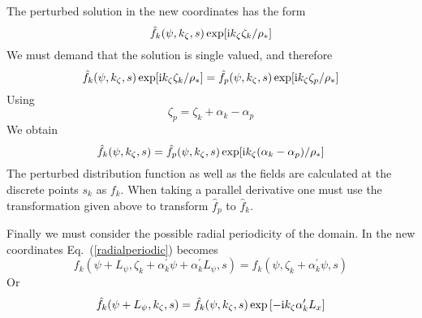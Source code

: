 The perturbed solution in the new coordinates has the form 
\begin{equation} 
\hat f_k (\psi, k_\zeta, s) \exp [ {\rm i} k_\zeta \zeta_k / \rho_* ] 
\end{equation}
We must demand that the solution is single valued, and therefore 
\begin{equation} 
\hat f_k (\psi, k_\zeta, s) \exp [ {\rm i} k_\zeta \zeta_k / \rho_* ] =
\hat f_{p} (\psi, k_\zeta, s) \exp [ {\rm i} k_\zeta \zeta_{p} / \rho_* ]
\end{equation}
Using 
\begin{equation} 
\zeta_{p} = \zeta_k + \alpha_k - \alpha_{p} 
\end{equation} 
We obtain 
\begin{equation} 
\hat f_k (\psi, k_\zeta, s)  =
\hat f_{p} (\psi, k_\zeta, s) \exp [ {\rm i} k_\zeta (\alpha_k - \alpha_{p}) / \rho_* ]
\end{equation}
The perturbed distribution function as well as the fields are calculated at the discrete points 
$s_k$ as $f_k$. When taking a parallel derivative one must use the transformation given above 
to transform $\hat f_p$ to $\hat f_k$. 

Finally we must consider the possible radial periodicity of the domain. In the new coordinates 
Eq.~(\ref{radialperiodic}) becomes 
\begin{equation}  
f_k(\psi + L_\psi,\zeta_k + \alpha_k^\prime \psi + \alpha_k^\prime L_\psi,s) = 
f_k(\psi, \zeta_k + \alpha_k^\prime \psi, s) 
\end{equation}
Or 
\begin{equation} 
\hat f_k(\psi + L_\psi,k_\zeta,s) = \hat f_k (\psi, k_\zeta,s) \exp \left [ -
{\rm i} k_\zeta \alpha_k^\prime L_x \right ] 
\end{equation}

